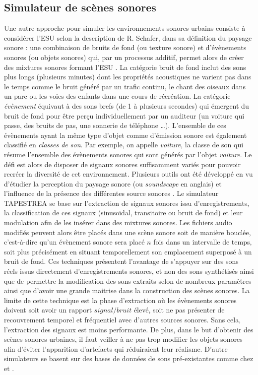 \subsection{Simulateur de scènes sonores}

Une autre approche pour simuler les environnements sonores urbains consiste à considérer l'ESU selon la description de R. Schafer, dans sa définition du paysage sonore \cite{schafer1977tuning} : une combinaison de bruits de fond (ou texture  sonore) et d'évènements sonores (ou objets sonores) qui, par un processus additif, permet alors de créer des mixtures sonores formant l'ESU . La catégorie bruit de fond inclut des sons plus longs (plusieurs minutes) dont les propriétés acoustiques ne varient pas dans le temps comme le bruit généré par un trafic continu, le chant des oiseaux dans un parc ou les voies des enfants dans une cours de récréation.
La catégorie \textit{évènement} équivaut à des sons brefs (de 1 à plusieurs secondes) qui émergent du bruit de fond pour être perçu individuellement par un auditeur (un voiture qui passe, des bruits de pas, une sonnerie de téléphone \dots). L'ensemble de ces évènements ayant la même type d'objet comme d'émission sonore est également classifié en \textit{classes de son}. Par exemple, on appelle \textit{voiture}, la classe de son qui résume l'ensemble des évènements sonores qui sont générés par l'objet \textit{voiture}.
Le défi est alors de disposer de signaux sonores suffisamment variés pour pouvoir recréer la diversité de cet environnement. Plusieurs outils ont été développé en vu d'étudier la perception du paysage sonore (ou \textit{soundscape} en anglais) et l'influence de la présence des différentes source sonores \cite{valle2009framework, finney2010soundscape}. Le simulateur TAPESTREA \cite{misra_musical_2007} se base sur l'extraction de signaux sonores issu d'enregistrements, la classification de ces signaux (sinusoïdal, transitoire ou bruit de fond) et leur modulation afin de les insérer dans des mixtures sonores. Les fichiers audio modifiés peuvent alors être placés dans une scène sonore soit de manière bouclée, c'est-à-dire qu'un évènement sonore sera placé $n$ fois dans un intervalle de temps, soit plus précisément en situant temporellement son emplacement superposé à un bruit de fond.
Ces techniques présentent l'avantage de s'appuyer sur des sons réels issus directement d'enregistrements sonores, et non des sons synthétisés ainsi que de permettre la modification des sons extraits selon de nombreux paramètres ainsi que d'avoir une grande maitrise dans la construction des scènes sonores. La limite de cette technique est la phase d'extraction où les évènements sonores doivent soit avoir un rapport $signal/bruit$ élevé, soit ne pas présenter de recouvrement temporel et fréquentiel avec d'autres sources sonores. Sans cela, l'extraction des signaux est moins performante. De plus, dans le but d'obtenir des scènes sonores urbaines, il faut veiller à ne pas trop modifier les objets sonores afin d'éviter l'apparition d'artefacts qui réduiraient leur réalisme.
D'autre simulateurs se basent sur des bases de données de sons pré-existantes comme chez \cite{bruce_development_2009} et \cite{rossignol_simscene_2015}.

